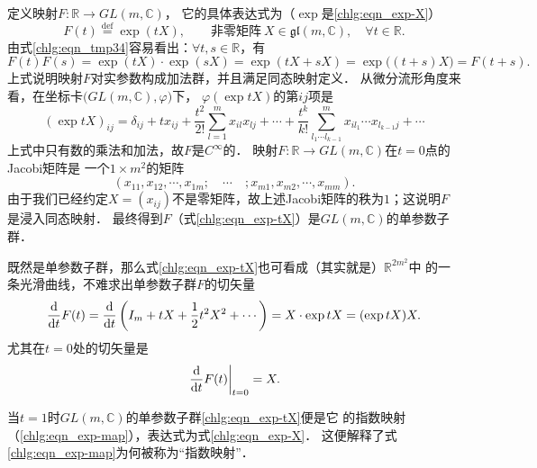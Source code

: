 定义映射$F:\mathbb{R}\to GL(m,\mathbb{C})$，
它的具体表达式为（$\exp$是\eqref{chlg:eqn_exp-X}）
\begin{equation}\label{chlg:eqn_exp-tX}
   F(t) \overset{\mathrm {def}}{=} \exp(t X),\qquad \text{非零矩阵}\ 
      X \in \mathfrak{gl}(m,\mathbb{C}),\quad \forall t\in \mathbb{R} .
\end{equation}
由式\eqref{chlg:eqn_tmp34}容易看出：$\forall t,s \in \mathbb{R}$，有
\begin{equation*}
    F(t)F(s) = \exp(t X) \cdot \exp(s X) = \exp(t X + s X)
    =\exp\bigl((t+s) X\bigr) = F(t+s) .
\end{equation*}
上式说明映射$F$对实参数构成加法群，并且满足同态映射定义．
从微分流形角度来看，在坐标卡$\bigl(GL(m,\mathbb{C}),\varphi \bigr)$下，
$\varphi(\exp tX)$的第$ij$项是
\begin{equation*}
    (\exp tX )_{ij} = \delta_{ij} + t x_{ij} + \frac{t^2}{2!} \sum_{l=1}^{m} x_{il} x_{lj}
    + \cdots + \frac{t^k}{k!} \sum_{l_1\cdots l_{k-1}}^{m} x_{il_1} \cdots x_{l_{k-1} j}
    + \cdots 
\end{equation*}
上式中只有数的乘法和加法，故$F$是$C^\infty$的．
映射$F:\mathbb{R}\to GL(m,\mathbb{C})$在$t=0$点的Jacobi矩阵是
一个$1\times m^2$的矩阵
\begin{equation}
    (x_{11},x_{12},\cdots,x_{1m};\quad\cdots\quad;x_{m1},x_{m2},\cdots,x_{mm}) .
\end{equation}
由于我们已经约定$X=(x_{ij})$不是零矩阵，故上述Jacobi矩阵的秩为$1$；这说明$F$是浸入同态映射．
最终得到$F$（式\eqref{chlg:eqn_exp-tX}）是$GL(m,\mathbb{C})$的单参数子群．


既然是单参数子群，那么式\eqref{chlg:eqn_exp-tX}也可看成（其实就是）$\mathbb{R}^{2m^2}$中
的一条光滑曲线，不难求出单参数子群$F$的切矢量
\begin{equation}\label{chlg:eqn_Dexp-all}
    \frac{{\rm d}}{{\rm d}t} F(t)
    = \frac{{\rm d}}{{\rm d}t} \left(I_m + t X 
    +\frac{1}{2}t^2 X^2 +\cdots \right)
    = X \cdot \exp tX = (\exp tX) X .
\end{equation}  %
尤其在$t=0$处的切矢量是
\begin{equation}\label{chlg:eqn_Dexp}
    \left. \frac{{\rm d}}{{\rm d}t} F(t)\right|_{t=0}    = X .  
\end{equation}

当$t=1$时$GL(m,\mathbb{C})$的单参数子群\eqref{chlg:eqn_exp-tX}便是它
的{\kaishu 指数映射}（\eqref{chlg:eqn_exp-map}），表达式为式\eqref{chlg:eqn_exp-X}．
这便解释了式\eqref{chlg:eqn_exp-map}为何被称为“{\heiti 指数映射}”．


